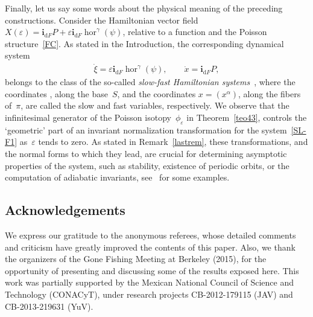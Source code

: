 \documentclass[10pt,a4paper]{amsart}
\numberwithin{equation}{section}
\begin{document}
Finally, let us say some words about the physical meaning of the preceding constructions. Consider the Hamiltonian vector f\/ield
$X(\varepsilon)=\mathbf{i}_{\mathrm{d}F}P+\varepsilon\mathbf{i}_{\mathrm{d}F} \operatorname{hor}^{\gamma}(\psi)$, relative
to a function  and the Poisson structure~\eqref{FC}. As stated in the Introduction, the corresponding dynamical system
\begin{gather}\label{SL-F1}
\dot{\xi}=\varepsilon\mathbf{i}_{\mathrm{d}F}\operatorname{hor}^{\gamma}(\psi),\qquad \dot{x}=\mathbf{i}_{\mathrm{d}F}P,
\end{gather}
belongs to the class of the so-called \emph{slow-fast Hamiltonian systems}~\cite{ArKN-88}, where the coordinates , along the base~$S$, and the coordinates $x=(x^{\alpha})$, along the f\/ibers of~$\pi$, are called the slow and fast variables, respectively. We observe that the inf\/initesimal generator of the Poisson isotopy~$\phi_{\varepsilon}$ in Theorem~\ref{teo43}, controls the `geometric' part of an invariant normalization transformation for the system~\eqref{SL-F1} as~$\varepsilon$ tends to zero. As stated in Remark~\ref{lastrem}, these transformations, and the normal forms to which they lead, are crucial for determining asymptotic properties of the system, such as stability, existence of periodic orbits, or the computation of adiabatic invariants, see~\cite{MJYu-13} for some examples.

\subsection*{Acknowledgements}

We express our gratitude to the anonymous referees, whose detailed comments and criticism have greatly improved the contents of this paper. Also, we thank the organizers of the Gone Fishing Meeting at Berkeley (2015), for the opportunity of presenting and discussing some of the results exposed here. This work was partially supported by the Mexican National Council of Science and Technology (CONACyT), under research projects CB-2012-179115 (JAV) and CB-2013-219631 (YuV).

\end{document}
